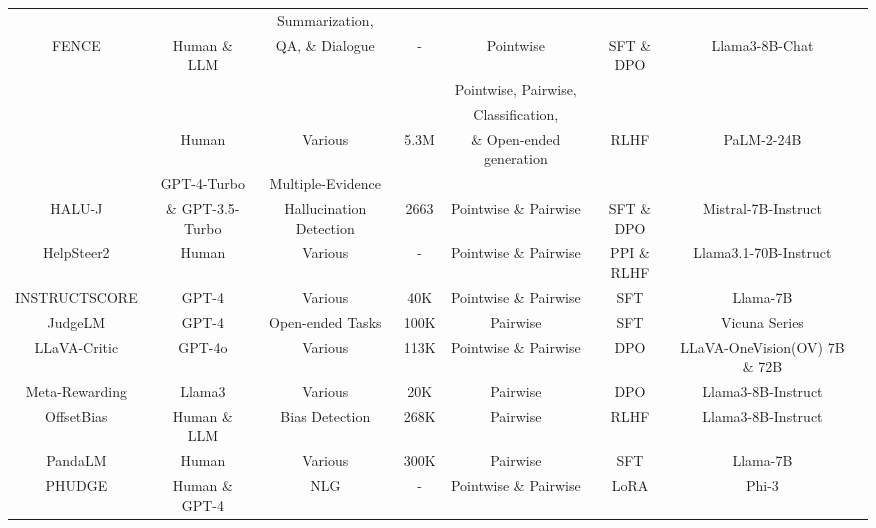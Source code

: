 \begin{table}[t]
{\begin{tabular}{cccccccc}
&&Summarization,&&&&\\
\multirow{-2}{*}{FENCE~\cite{xie2024improving}}&\multirow{-2}{*}{Human \& LLM}&QA, \& Dialogue&\multirow{-2}{*}{-}&\multirow{-2}{*}{Pointwise}&\multirow{-2}{*}{SFT \& DPO}&\multirow{-2}{*}{Llama3-8B-Chat}\\

\rowcolor{mygray}
&&&&Pointwise, Pairwise,&&\\
\rowcolor{mygray}
&&&&Classification,&&\\
\rowcolor{mygray}
\multirow{-3}{*}{FLAMe~\cite{vu2024foundational}}&\multirow{-3}{*}{Human}&\multirow{-3}{*}{Various}&\multirow{-3}{*}{5.3M}&\& Open-ended generation&\multirow{-3}{*}{RLHF}&\multirow{-3}{*}{PaLM-2-24B}\\

&GPT-4-Turbo&Multiple-Evidence&&&&\\
\multirow{-2}{*}{HALU-J~\cite{wang2024halu}}&\& GPT-3.5-Turbo&Hallucination Detection&\multirow{-2}{*}{2663}&\multirow{-2}{*}{Pointwise \& Pairwise}&\multirow{-2}{*}{SFT \& DPO}&\multirow{-2}{*}{Mistral-7B-Instruct}\\

\rowcolor{mygray}
HelpSteer2~\cite{wang2024helpsteer2}&Human&Various&-&Pointwise \& Pairwise&PPI \& RLHF&Llama3.1-70B-Instruct\\

INSTRUCTSCORE~\cite{xu2023instructscore}&GPT-4&Various&40K&Pointwise \& Pairwise&SFT&Llama-7B\\

\rowcolor{mygray}
JudgeLM~\cite{zhu2023judgelm}&GPT-4&Open-ended Tasks&100K&Pairwise&SFT&Vicuna Series\\

LLaVA-Critic~\cite{xiong2024llava}&GPT-4o&Various&113K&Pointwise \& Pairwise&DPO&LLaVA-OneVision(OV) 7B \& 72B\\

\rowcolor{mygray}
Meta-Rewarding~\cite{wu2024meta}&Llama3&Various&20K&Pairwise&DPO&Llama3-8B-Instruct\\

OffsetBias~\cite{park2024offsetbias}&Human \& LLM&Bias Detection&268K&Pairwise&RLHF&Llama3-8B-Instruct\\

\rowcolor{mygray}
PandaLM~\cite{wang2023pandalm}&Human&Various&300K&Pairwise&SFT&Llama-7B\\

PHUDGE~\cite{deshwal2024phudge}&Human \& GPT-4&NLG&-&Pointwise \& Pairwise&LoRA&Phi-3\\


\end{tabular}}
\end{table}
